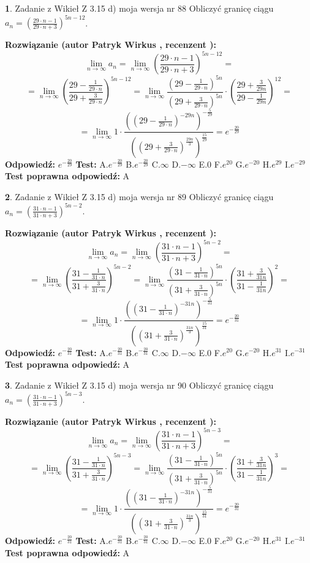 \documentclass[12pt, a4paper]{article}
\theoremstyle{definition} %
\newtheorem{zad}{}
\newcommand{\zadStart}[1]{\begin{zad}#1\newline}
\newcommand{\zadStop}{\end{zad}}
\newcommand{\rozwStart}[2]{\noindent \textbf{Rozwiązanie (autor #1 , recenzent #2): }\newline}
\newcommand{\rozwStop}{\newline}
\newcommand{\odpStart}{\noindent \textbf{Odpowiedź:}\newline}
\newcommand{\odpStop}{\newline}
\newcommand{\testStart}{\noindent \textbf{Test:}\newline}
\newcommand{\testStop}{\newline}
\newcommand{\kluczStart}{\noindent \textbf{Test poprawna odpowiedź:}\newline}
\newcommand{\kluczStop}{\newline}
\begin{document}
\zadStart{Zadanie z Wikieł Z 3.15 d) moja wersja nr 88}
Obliczyć granicę ciągu $a_{n}=(\frac{29\cdot n - 1}{29 \cdot n + 3})^{5n-12}$.
\zadStop
\rozwStart{Patryk Wirkus}{}
$$\lim\limits_{n\to\infty} a_{n} = \lim\limits_{n\to\infty}(\frac{29\cdot n - 1}{29 \cdot n + 3})^{5n-12}=$$
$$=\lim\limits_{n\to\infty}(\frac{29 - \frac{1}{29\cdot n}}{29 + \frac{3}{29 \cdot n}})^{5n-12}=\lim\limits_{n\to\infty}\frac{(29 - \frac{1}{29\cdot n})^{5n}}{(29 + \frac{3}{29\cdot n})^{5n}} \cdot (\frac{29+\frac{3}{29n}}{29-\frac{1}{29n}})^{12}=$$
$$=\lim\limits_{n\to\infty} 1 \cdot \frac{((29-\frac{1}{29 \cdot n})^{-29n})^{-\frac{5}{29}}}{((29+\frac{3}{29 \cdot n})^{\frac{29n}{3}})^{\frac{15}{29}}} =e^{-\frac{20}{29}}$$
\rozwStop
\odpStart
$e^{-\frac{20}{29}}$
\odpStop
\testStart
A.$ e^{-\frac{20}{29}}$
B.$ e^{-\frac{20}{29}}$
C.$\infty$
D.$-\infty$
E.$0$
F.$e^{20}$
G.$e^{-20}$
H.$e^{29}$
I.$e^{-29}$
\testStop
\kluczStart
A
\kluczStop



\zadStart{Zadanie z Wikieł Z 3.15 d) moja wersja nr 89}
Obliczyć granicę ciągu $a_{n}=(\frac{31\cdot n - 1}{31 \cdot n + 3})^{5n-2}$.
\zadStop
\rozwStart{Patryk Wirkus}{}
$$\lim\limits_{n\to\infty} a_{n} = \lim\limits_{n\to\infty}(\frac{31\cdot n - 1}{31 \cdot n + 3})^{5n-2}=$$
$$=\lim\limits_{n\to\infty}(\frac{31 - \frac{1}{31\cdot n}}{31 + \frac{3}{31 \cdot n}})^{5n-2}=\lim\limits_{n\to\infty}\frac{(31 - \frac{1}{31\cdot n})^{5n}}{(31 + \frac{3}{31\cdot n})^{5n}} \cdot (\frac{31+\frac{3}{31n}}{31-\frac{1}{31n}})^{2}=$$
$$=\lim\limits_{n\to\infty} 1 \cdot \frac{((31-\frac{1}{31 \cdot n})^{-31n})^{-\frac{5}{31}}}{((31+\frac{3}{31 \cdot n})^{\frac{31n}{3}})^{\frac{15}{31}}} =e^{-\frac{20}{31}}$$
\rozwStop
\odpStart
$e^{-\frac{20}{31}}$
\odpStop
\testStart
A.$ e^{-\frac{20}{31}}$
B.$ e^{-\frac{20}{31}}$
C.$\infty$
D.$-\infty$
E.$0$
F.$e^{20}$
G.$e^{-20}$
H.$e^{31}$
I.$e^{-31}$
\testStop
\kluczStart
A
\kluczStop



\zadStart{Zadanie z Wikieł Z 3.15 d) moja wersja nr 90}
Obliczyć granicę ciągu $a_{n}=(\frac{31\cdot n - 1}{31 \cdot n + 3})^{5n-3}$.
\zadStop
\rozwStart{Patryk Wirkus}{}
$$\lim\limits_{n\to\infty} a_{n} = \lim\limits_{n\to\infty}(\frac{31\cdot n - 1}{31 \cdot n + 3})^{5n-3}=$$
$$=\lim\limits_{n\to\infty}(\frac{31 - \frac{1}{31\cdot n}}{31 + \frac{3}{31 \cdot n}})^{5n-3}=\lim\limits_{n\to\infty}\frac{(31 - \frac{1}{31\cdot n})^{5n}}{(31 + \frac{3}{31\cdot n})^{5n}} \cdot (\frac{31+\frac{3}{31n}}{31-\frac{1}{31n}})^{3}=$$
$$=\lim\limits_{n\to\infty} 1 \cdot \frac{((31-\frac{1}{31 \cdot n})^{-31n})^{-\frac{5}{31}}}{((31+\frac{3}{31 \cdot n})^{\frac{31n}{3}})^{\frac{15}{31}}} =e^{-\frac{20}{31}}$$
\rozwStop
\odpStart
$e^{-\frac{20}{31}}$
\odpStop
\testStart
A.$ e^{-\frac{20}{31}}$
B.$ e^{-\frac{20}{31}}$
C.$\infty$
D.$-\infty$
E.$0$
F.$e^{20}$
G.$e^{-20}$
H.$e^{31}$
I.$e^{-31}$
\testStop
\kluczStart
A
\kluczStop
\end{document}
